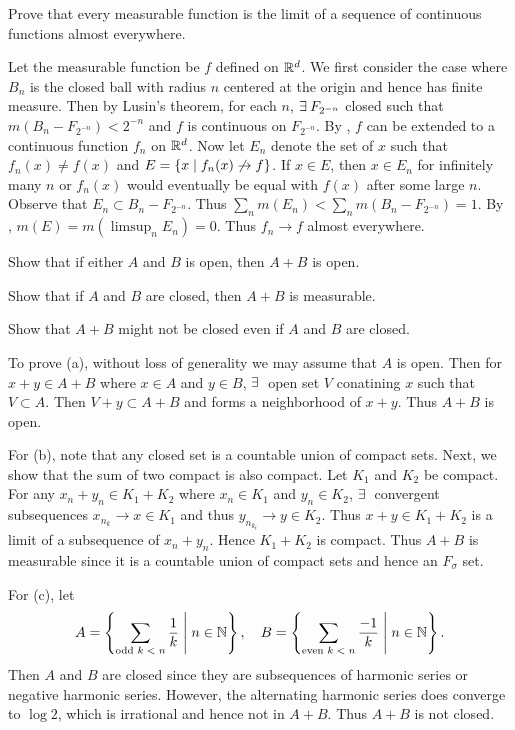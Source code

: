 \begin{exercise}
    Prove that every measurable function is the limit of a 
    sequence of continuous functions almost everywhere.
\end{exercise}
\begin{pf}
    Let the measurable function be $f$ defined on $\mathbb{R}^d$. 
    We first consider the case where $B_n$ is the closed ball 
    with radius $n$ centered at the origin and hence has 
    finite measure. Then by Lusin's theorem, for each $n$, 
    $\exists\: F_{2^{-n}}$ closed such that 
    $m(B_n-F_{2^{-n}})< 2^{-n}$ and $f$ is 
    continuous on $F_{2^{-n}}$. By , $f$ can be 
    extended to a continuous function $f_n$ on $\mathbb{R}^d$. Now let 
    $E_n$ denote the set of $x$ such that $f_n(x)\neq f(x)$ and 
    $E = \left\{ x \;\middle\vert\; f_n(x)\not\to f \right\}$. If $x\in E$, then 
    $x\in E_n$ for infinitely many $n$ or $f_n(x)$ would 
    eventually be equal with $f(x)$ after some large $n$.
    Observe that $E_n\subset B_n-F_{2^{-n}}$. Thus 
    $\sum_n m(E_n) < \sum_n m(B_n-F_{2^{-n}})=1$. By 
    , $m(E) = m(\limsup_n E_n) = 0$. Thus 
    $f_n\to f$ almost everywhere.
\end{pf}

\begin{exercise}
    \begin{thmenum}
        \item Show that if either $A$ and $B$ is open, then
        $A+B$ is open.
        \item Show that if $A$ and $B$ are closed, then $A+B$ 
        is measurable. 
        \item Show that $A+B$ might not be closed even if $A$ 
        and $B$ are closed.
    \end{thmenum}
\end{exercise}
\begin{pf}
    To prove (a), without loss of generality we may assume 
    that $A$ is open. Then for $x+y\in A+B$ where $x\in A$ 
    and $y\in B$, $\exists\:$ open set $V$ conatining $x$ such 
    that $V\subset A$. Then $V+y\subset A+B$ and forms a 
    neighborhood of $x+y$. Thus $A+B$ is open.

    For (b), note that any closed set is a countable union of 
    compact sets. Next, we show that the sum of two compact 
    is also compact. Let $K_1$ and $K_2$ be compact. For any 
    $x_n+y_n\in K_1+K_2$ where $x_n\in K_1$ and $y_n\in K_2$, 
    $\exists\:$ convergent subsequences $x_{n_k}\to x\in K_1$ and 
    thus $y_{n_{k_l}}\to y\in K_2$. Thus $x+y\in K_1+K_2$ is a 
    limit of a subsequence of $x_n+y_n$. Hence $K_1+K_2$ is 
    compact. Thus $A+B$ is measurable since it is a countable 
    union of compact sets and hence an $F_\sigma$ set. 
    
    For (c), let 
    \[
        A = \left\{ \sum_{\text{odd $k<n$}}\frac{1}{k} \;\middle\vert\; n\in\mathbb{N} \right\},\quad
        B = \left\{ \sum_{\text{even $k<n$}}\frac{-1}{k} \;\middle\vert\; n\in\mathbb{N} \right\}.
    \]
    Then $A$ and $B$ are closed since they are subsequences of 
    harmonic series or negative harmonic series. However, the 
    alternating harmonic series does converge to $\log{2}$, 
    which is irrational and hence not in $A+B$. Thus $A+B$ is 
    not closed.
\end{pf}

